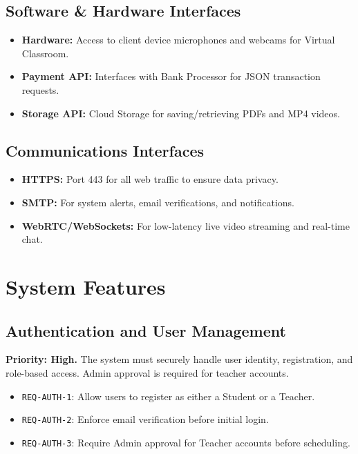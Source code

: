 \documentclass[11pt,a4paper]{article}
\begin{document}
\subsection{Software \& Hardware Interfaces}
\begin{itemize}
    \item \textbf{Hardware:} Access to client device microphones and webcams for Virtual Classroom.
    \item \textbf{Payment API:} Interfaces with Bank Processor for JSON transaction requests.
    \item \textbf{Storage API:} Cloud Storage for saving/retrieving PDFs and MP4 videos.
\end{itemize}

\subsection{Communications Interfaces}
\begin{itemize}
    \item \textbf{HTTPS:} Port 443 for all web traffic to ensure data privacy.
    \item \textbf{SMTP:} For system alerts, email verifications, and notifications.
    \item \textbf{WebRTC/WebSockets:} For low-latency live video streaming and real-time chat.
\end{itemize}

\section{System Features}

\subsection{Authentication and User Management}
\textbf{Priority: High.} The system must securely handle user identity, registration, and role-based access. Admin approval is required for teacher accounts.
\begin{itemize}[label=--]
    \item \texttt{REQ-AUTH-1}: Allow users to register as either a Student or a Teacher.
    \item \texttt{REQ-AUTH-2}: Enforce email verification before initial login.
    \item \texttt{REQ-AUTH-3}: Require Admin approval for Teacher accounts before scheduling.
\end{itemize}
\end{document}

